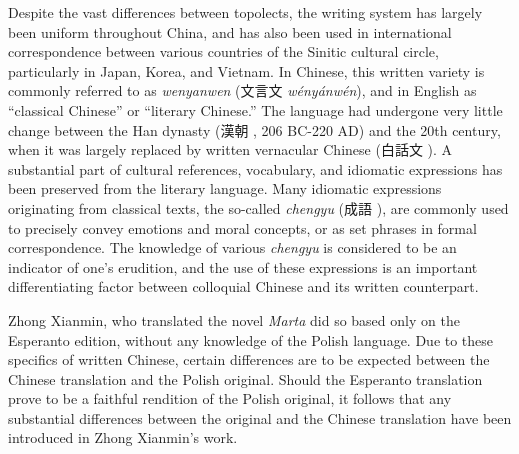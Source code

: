 Despite the vast differences between topolects, the writing system has largely been uniform throughout China, and has also been used in international correspondence between various countries of the Sinitic cultural circle, particularly in Japan, Korea, and Vietnam.
In Chinese, this written variety is commonly referred to as \textit{wenyanwen} (文言文 \textit{wényánwén}), and in English as ``classical Chinese'' or ``literary Chinese.''
The language had undergone very little change between the Han dynasty (漢朝 , 206 BC-220 AD) and the 20th century, when it was largely replaced by written vernacular Chinese (白話文 ).
A substantial part of cultural references, vocabulary, and idiomatic expressions has been preserved from the literary language.
Many idiomatic expressions originating from classical texts, the so-called \textit{chengyu} (成語 ), are commonly used to precisely convey emotions and moral concepts, or as set phrases in formal correspondence.
The knowledge of various \textit{chengyu} is considered to be an indicator of one's erudition, and the use of these expressions is an important differentiating factor between colloquial Chinese and its written counterpart.

Zhong Xianmin, who translated the novel \textit{Marta} did so based only on the Esperanto edition, without any knowledge of the Polish language.
Due to these specifics of written Chinese, certain differences are to be expected between the Chinese translation and the Polish original.
Should the Esperanto translation prove to be a faithful rendition of the Polish original, it follows that any substantial differences between the original and the Chinese translation have been introduced in Zhong Xianmin's work.

